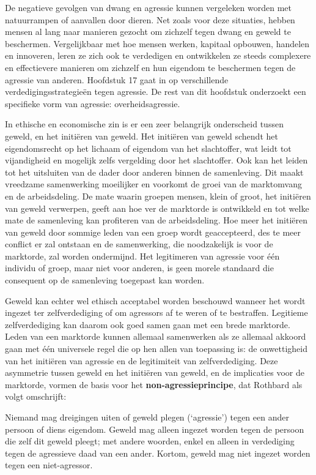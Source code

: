 De negatieve gevolgen van dwang en agressie kunnen vergeleken worden met natuurrampen of aanvallen door dieren. Net zoals voor deze situaties, hebben mensen al lang naar manieren gezocht om zichzelf tegen dwang en geweld te beschermen. Vergelijkbaar met hoe mensen werken, kapitaal opbouwen, handelen en innoveren, leren ze zich ook te verdedigen en ontwikkelen ze steeds complexere en effectievere manieren om zichzelf en hun eigendom te beschermen tegen de agressie van anderen. Hoofdstuk 17 gaat in op verschillende verdedigingsstrategieën tegen agressie. De rest van dit hoofdstuk onderzoekt een specifieke vorm van agressie: overheidsagressie.

In ethische en economische zin is er een zeer belangrijk onderscheid tussen geweld, en het initiëren van geweld. Het initiëren van geweld schendt het eigendomsrecht op het lichaam of eigendom van het slachtoffer, wat leidt tot vijandigheid en mogelijk zelfs vergelding door het slachtoffer. Ook kan het leiden tot het uitsluiten van de dader door anderen binnen de samenleving. Dit maakt vreedzame samenwerking moeilijker en voorkomt de groei van de marktomvang en de arbeidsdeling. De mate waarin groepen mensen, klein of groot, het initiëren van geweld verwerpen, geeft aan hoe ver de marktorde is ontwikkeld en tot welke mate de samenleving kan profiteren van de arbeidsdeling. Hoe meer het initiëren van geweld door sommige leden van een groep wordt geaccepteerd, des te meer conflict er zal ontstaan en de samenwerking, die noodzakelijk is voor de marktorde, zal worden ondermijnd. Het legitimeren van agressie voor één individu of groep, maar niet voor anderen, is geen morele standaard die consequent op de samenleving toegepast kan worden.

Geweld kan echter wel ethisch acceptabel worden beschouwd wanneer het wordt ingezet ter zelfverdediging of om agressors af te weren of te bestraffen. Legitieme zelfverdediging kan daarom ook goed samen gaan met een brede marktorde. Leden van een marktorde kunnen allemaal samenwerken als ze allemaal akkoord gaan met één universele regel die op hen allen van toepassing is: de onwettigheid van het initiëren van agressie en de legitimiteit van zelfverdediging. Deze asymmetrie tussen geweld en het initiëren van geweld, en de implicaties voor de marktorde, vormen de basis voor het \textbf{non-agressieprincipe}, dat Rothbard als volgt omschrijft:

\begin{blockquotebox}
Niemand mag dreigingen uiten of geweld plegen (`agressie') tegen een ander persoon of diens eigendom. Geweld mag alleen ingezet worden tegen de persoon die zelf dit geweld pleegt; met andere woorden, enkel en alleen in verdediging tegen de agressieve daad van een ander. Kortom, geweld mag niet ingezet worden tegen een niet-agressor.\footnotemark
\end{blockquotebox}

